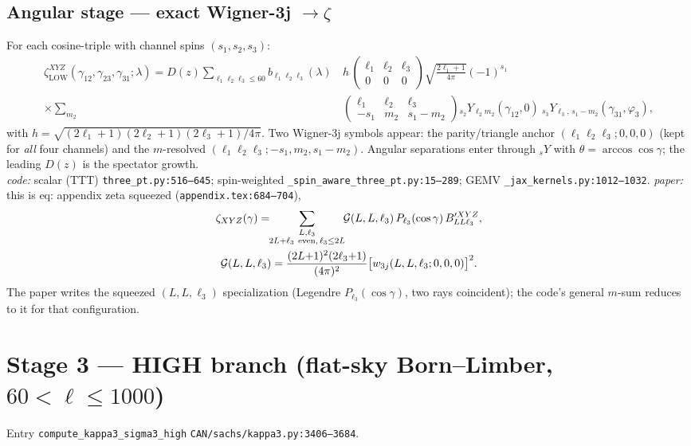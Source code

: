 \documentclass[11pt]{article}
\newcommand{\code}[1]{\texttt{\footnotesize #1}}
\newcommand{\eq}[1]{\textsf{#1}}                 %
\newcommand{\lam}{\lambda}
\newcommand{\Dgrow}{D}
\newcommand{\wjjj}[1]{\begin{pmatrix}#1\end{pmatrix}}
\begin{document}
\subsection{Angular stage --- exact Wigner-3j $\to\zeta$}
\label{sec:angular}
For each cosine-triple with channel spins $(s_1,s_2,s_3)$:
\begin{equation}
\begin{aligned}
\zeta_{\mathrm{LOW}}^{XYZ}(\gamma_{12},\gamma_{23},\gamma_{31};\lam)
 =\Dgrow(z)\!\!\sum_{\ell_1\ell_2\ell_3\le 60}\!\! b_{\ell_1\ell_2\ell_3}(\lam)\,
   &h\,\wjjj{\ell_1&\ell_2&\ell_3\\0&0&0}\sqrt{\tfrac{2\ell_1+1}{4\pi}}(-1)^{s_1}\\[-2pt]
 \times\sum_{m_2}\ &\wjjj{\ell_1&\ell_2&\ell_3\\-s_1&m_2&s_1-m_2}
   {}_{s_2}Y_{\ell_2 m_2}(\gamma_{12},0)\ {}_{s_3}Y_{\ell_3,\,s_1-m_2}(\gamma_{31},\varphi_3),
\end{aligned}
\label{eq:zetalow}
\end{equation}
with $h=\sqrt{(2\ell_1+1)(2\ell_2+1)(2\ell_3+1)/4\pi}$. Two Wigner-3j symbols appear:
the parity/triangle anchor $(\ell_1\ell_2\ell_3;0,0,0)$ (kept for \emph{all} four channels)
and the $m$-resolved $(\ell_1\ell_2\ell_3;-s_1,m_2,s_1{-}m_2)$. Angular separations enter
through ${}_sY$ with $\theta=\arccos\cos\gamma$; the leading $\Dgrow(z)$ is the spectator
growth.\\
\textit{code:} scalar (TTT) \code{three\_pt.py:516--645}; spin-weighted
\code{\_spin\_aware\_three\_pt.py:15--289}; GEMV \code{\_jax\_kernels.py:1012--1032}.\quad
\textit{paper:} this is \eq{eq: appendix zeta squeezed} (\code{appendix.tex:684--704}),
\begin{gather}
\zeta_{XYZ}(\gamma)=\!\!\sum_{\substack{L,\ell_3\\ 2L+\ell_3\ \mathrm{even},\,\ell_3\le 2L}}\!\!
   \mathcal{G}(L,L,\ell_3)\,P_{\ell_3}(\cos\gamma)\,B'^{XYZ}_{LL\ell_3},\notag\\
\mathcal{G}(L,L,\ell_3)=\frac{(2L{+}1)^2(2\ell_3{+}1)}{(4\pi)^2}\bigl[w_{3j}(L,L,\ell_3;0,0,0)\bigr]^2 .
\end{gather}
The paper writes the squeezed $(L,L,\ell_3)$ specialization (Legendre $P_{\ell_3}(\cos\gamma)$,
two rays coincident); the code's general $m$-sum reduces to it for that configuration.

\section{Stage 3 --- HIGH branch (flat-sky Born--Limber, $60<\ell\le 1000$)}
Entry \code{compute\_kappa3\_sigma3\_high} \code{CAN/sachs/kappa3.py:3406--3684}.
\end{document}
